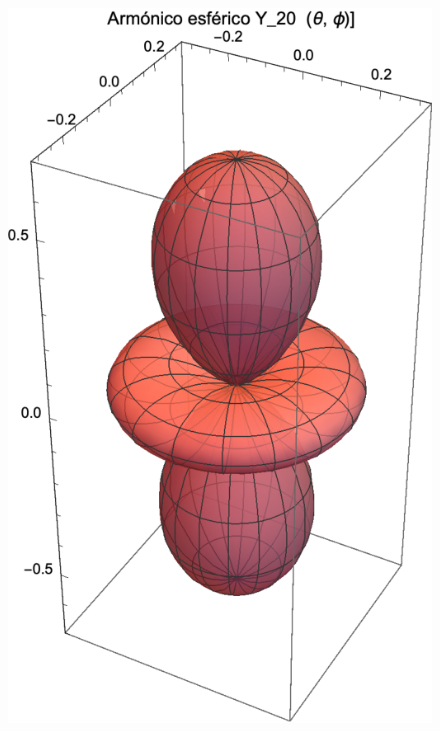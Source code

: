 \documentclass[12pt]{beamer}
\begin{document}
\begin{frame}[plain]
\begin{figure}
    \centering
    \includegraphics[scale=0.65]{Imagenes/Armonicos_Esfericos_20.eps}
\end{figure}
\end{frame}
\end{document}
